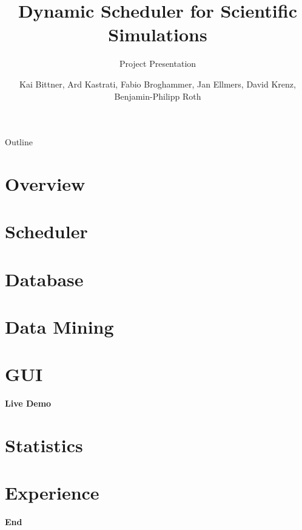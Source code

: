 \documentclass[18pt]{beamer}
\title[Project Presentation]{Dynamic Scheduler for Scientific Simulations}
\subtitle{Project Presentation}
\author{Kai Bittner, Ard Kastrati, Fabio Broghammer, Jan Ellmers, David Krenz, Benjamin-Philipp Roth}
\institute{Steinbuch Centre for Computing - SCC}
\begin{document}

\begin{frame}
\titlepage
\end{frame}




\begin{frame}{Outline}
\tableofcontents
\end{frame}

\section{Overview}

\section{Scheduler}

\section{Database}



\section{Data Mining}


\section{GUI}


\begin{frame}
	\begin{center}
			\huge{\textbf{Live Demo}}
	\end{center}		
\end{frame}
\section{Statistics}

\section{Experience}

\begin{frame}
	\begin{center}
			\huge{\textbf{End}}
	\end{center}		
\end{frame}
\end{document}
